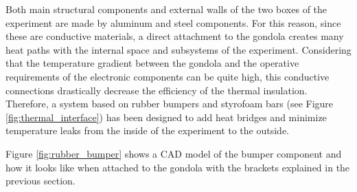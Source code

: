 Both main structural components and external walls of the two boxes of the experiment are made by aluminum and steel components. For this reason, since these are conductive materials, a direct attachment to the gondola creates many heat paths with the internal space and subsystems of the experiment. Considering that the temperature gradient between the gondola and the operative requirements of the electronic components can be quite high, this conductive connections drastically decrease the efficiency of the thermal insulation. Therefore, a system based on rubber bumpers and styrofoam bars (see Figure \ref{fig:thermal_interface}) has been designed to add heat bridges and minimize temperature leaks from the inside of the experiment to the outside.

Figure \ref{fig:rubber_bumper} shows a CAD model of the bumper component and how it looks like when attached to the gondola with the brackets explained in the previous section.

